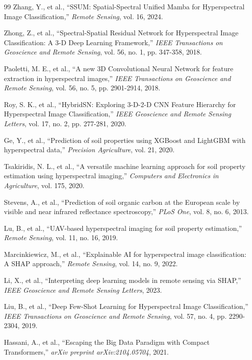 \documentclass[pdflatex,sn-mathphys-num,iicol]{sn-jnl}
\begin{document}
\begin{thebibliography}{99}
Zhang, Y., et al., ``SSUM: Spatial-Spectral Unified Mamba for Hyperspectral Image Classification,'' \textit{Remote Sensing}, vol. 16, 2024.

Zhong, Z., et al., ``Spectral-Spatial Residual Network for Hyperspectral Image Classification: A 3-D Deep Learning Framework,'' \textit{IEEE Transactions on Geoscience and Remote Sensing}, vol. 56, no. 1, pp. 347-358, 2018.

Paoletti, M. E., et al., ``A new 3D Convolutional Neural Network for feature extraction in hyperspectral images,'' \textit{IEEE Transactions on Geoscience and Remote Sensing}, vol. 56, no. 5, pp. 2901-2914, 2018.

Roy, S. K., et al., ``HybridSN: Exploring 3-D-2-D CNN Feature Hierarchy for Hyperspectral Image Classification,'' \textit{IEEE Geoscience and Remote Sensing Letters}, vol. 17, no. 2, pp. 277-281, 2020.

Ge, Y., et al., ``Prediction of soil properties using XGBoost and LightGBM with hyperspectral data,'' \textit{Precision Agriculture}, vol. 21, 2020.

Tsakiridis, N. L., et al., ``A versatile machine learning approach for soil property estimation using hyperspectral imaging,'' \textit{Computers and Electronics in Agriculture}, vol. 175, 2020.

Stevens, A., et al., ``Prediction of soil organic carbon at the European scale by visible and near infrared reflectance spectroscopy,'' \textit{PLoS One}, vol. 8, no. 6, 2013.

Lu, B., et al., ``UAV-based hyperspectral imaging for soil property estimation,'' \textit{Remote Sensing}, vol. 11, no. 16, 2019.

Marcinkiewicz, M., et al., ``Explainable AI for hyperspectral image classification: A SHAP approach,'' \textit{Remote Sensing}, vol. 14, no. 9, 2022.

Li, X., et al., ``Interpreting deep learning models in remote sensing via SHAP,'' \textit{IEEE Geoscience and Remote Sensing Letters}, 2023.

Liu, B., et al., ``Deep Few-Shot Learning for Hyperspectral Image Classification,'' \textit{IEEE Transactions on Geoscience and Remote Sensing}, vol. 57, no. 4, pp. 2290-2304, 2019.

Hassani, A., et al., ``Escaping the Big Data Paradigm with Compact Transformers,'' \textit{arXiv preprint arXiv:2104.05704}, 2021.


\end{thebibliography}
\end{document}
